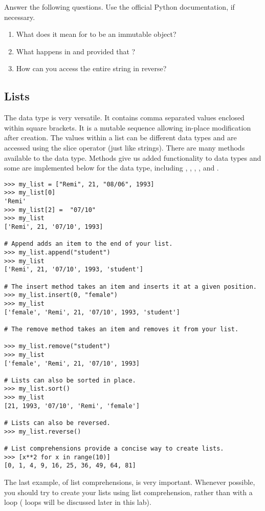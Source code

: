 \begin{problem}
Answer the following questions. Use the official Python documentation, if necessary.
\begin{enumerate}
\item What does it mean for  to be an immutable object? 
\item What happens in  and  provided 
that ? 
\item How can you access the entire string in reverse?
\end{enumerate}
\end{problem}

\subsection*{Lists}
\begin{example}
The  data type is very versatile. 
It contains comma separated values enclosed within square brackets. 
It is a mutable sequence allowing in-place modification after creation. 
The values within a list can be different data types and are accessed using the 
slice operator (just like strings). There are many methods available to the  data type. Methods give us added functionality to data types and some are implemented below for the  data type, including , , , , and .

\begin{lstlisting}
>>> my_list = ["Remi", 21, "08/06", 1993]
>>> my_list[0]
'Remi'
>>> my_list[2] =  "07/10"
>>> my_list
['Remi', 21, '07/10', 1993]

# Append adds an item to the end of your list.
>>> my_list.append("student")
>>> my_list
['Remi', 21, '07/10', 1993, 'student']

# The insert method takes an item and inserts it at a given position. 
>>> my_list.insert(0, "female")
>>> my_list
['female', 'Remi', 21, '07/10', 1993, 'student']

# The remove method takes an item and removes it from your list.

>>> my_list.remove("student")
>>> my_list
['female', 'Remi', 21, '07/10', 1993]

# Lists can also be sorted in place. 
>>> my_list.sort()
>>> my_list
[21, 1993, '07/10', 'Remi', 'female']

# Lists can also be reversed.
>>> my_list.reverse()

# List comprehensions provide a concise way to create lists. 
>>> [x**2 for x in range(10)]
[0, 1, 4, 9, 16, 25, 36, 49, 64, 81]

\end{lstlisting}

The last example, of list comprehensions, is very important. Whenever possible, you should try to create your lists using list comprehension, rather than with a  loop ( loops will be discussed later in this lab).
\end{example}

